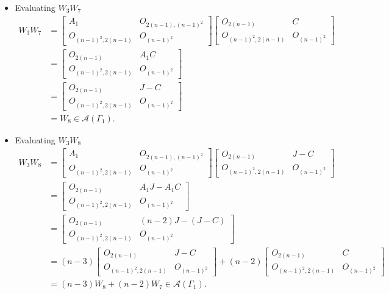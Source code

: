 \begin{itemize}
    \item Evaluating $W_3W_7$
    \begin{align*}
        W_3W_7
        &= \begin{bmatrix}
            A_1 & O_{2(n-1), (n-1)^2} \\
            O_{(n-1)^2, 2(n-1)} & O_{(n-1)^2}
        \end{bmatrix}\begin{bmatrix}
            O_{2(n-1)} & C \\
            O_{(n-1)^2, 2(n-1)} & O_{(n-1)^2}
        \end{bmatrix}\\
        &= \begin{bmatrix}
            O_{2(n-1)} & A_1C \\
            O_{(n-1)^2, 2(n-1)} & O_{(n-1)^2}
        \end{bmatrix} \\
        &= \begin{bmatrix}
            O_{2(n-1)} & J-C \\
            O_{(n-1)^2, 2(n-1)} & O_{(n-1)^2}
        \end{bmatrix} \\
        &= W_8\in\mathcal{A}(\Gamma_1).
    \end{align*}
    
    \item Evaluating $W_3W_8$
    \begin{align*}
        W_3W_8
        &= \begin{bmatrix}
            A_1 & O_{2(n-1), (n-1)^2} \\
            O_{(n-1)^2, 2(n-1)} & O_{(n-1)^2}
        \end{bmatrix}\begin{bmatrix}
            O_{2(n-1)} & J- C \\
            O_{(n-1)^2, 2(n-1)} & O_{(n-1)^2}
        \end{bmatrix}\\
        &= \begin{bmatrix}
            O_{2(n-1)} & A_1J - A_1C \\
            O_{(n-1)^2, 2(n-1)} & O_{(n-1)^2}
        \end{bmatrix} \\
        &= \begin{bmatrix}
            O_{2(n-1)} & (n-2)J-(J-C) \\
            O_{(n-1)^2, 2(n-1)} & O_{(n-1)^2}
        \end{bmatrix} \\
        &= (n-3)\begin{bmatrix}
            O_{2(n-1)} & J-C \\
            O_{(n-1)^2, 2(n-1)} & O_{(n-1)^2}
        \end{bmatrix} + (n-2)\begin{bmatrix}
            O_{2(n-1)} & C \\
            O_{(n-1)^2, 2(n-1)} & O_{(n-1)^2}
        \end{bmatrix}\\
        &= (n-3)W_8 + (n-2)W_7\in\mathcal{A}(\Gamma_1).
    \end{align*}
    

\end{itemize}
